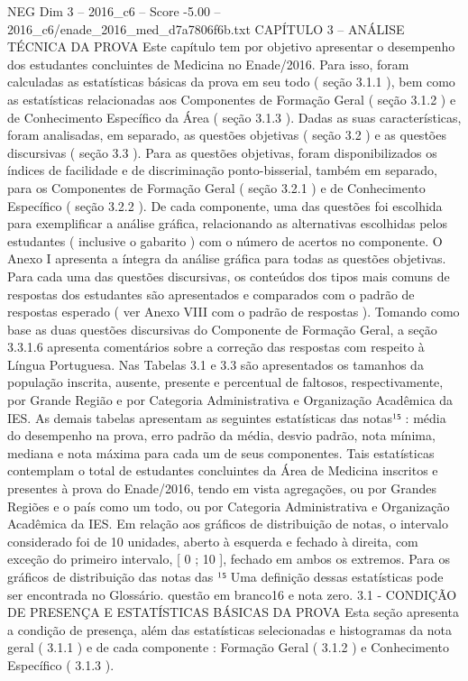 \begin{textsample}{NEG Dim 3 – 2016\_c6 – Score -5.00 – 2016\_c6/enade\_2016\_med\_d7a7806f6b.txt}  \label{ex:f3_neg_035}
CAPÍTULO 3 – ANÁLISE TÉCNICA DA PROVA Este capítulo tem por objetivo apresentar o desempenho dos estudantes concluintes de Medicina no Enade/2016.
Para isso, foram calculadas as estatísticas básicas da prova em seu todo ( seção 3.1.1 ), bem como as estatísticas relacionadas aos Componentes de Formação Geral ( seção 3.1.2 ) e de Conhecimento Específico da Área ( seção 3.1.3 ).
Dadas as suas características, foram analisadas, em separado, as questões objetivas ( seção 3.2 ) e as questões discursivas ( seção 3.3 ).
Para as questões objetivas, foram disponibilizados os índices de facilidade e de discriminação ponto-bisserial, também em separado, para os Componentes de Formação Geral ( seção 3.2.1 ) e de Conhecimento Específico ( seção 3.2.2 ).
De cada componente, uma das questões foi escolhida para exemplificar a análise gráfica, relacionando as alternativas escolhidas pelos estudantes ( inclusive o gabarito ) com o número de acertos no componente.
O Anexo I apresenta a íntegra da análise gráfica para todas as questões objetivas.
Para cada uma das questões discursivas, os conteúdos dos tipos mais comuns de respostas dos estudantes são apresentados e comparados com o padrão de respostas esperado ( ver Anexo VIII com o padrão de respostas ).
Tomando como base as duas questões discursivas do Componente de Formação Geral, a seção 3.3.1.6 apresenta comentários sobre a correção das respostas com respeito à Língua Portuguesa.
Nas Tabelas 3.1 e 3.3 são apresentados os tamanhos da população inscrita, ausente, presente e percentual de faltosos, respectivamente, por Grande Região e por Categoria Administrativa e Organização Acadêmica da IES.
As demais tabelas apresentam as seguintes estatísticas das notas¹⁵ : média do desempenho na prova, erro padrão da média, desvio padrão, nota mínima, mediana e nota máxima para cada um de seus componentes.
Tais estatísticas contemplam o total de estudantes concluintes da Área de Medicina inscritos e presentes à prova do Enade/2016, tendo em vista agregações, ou por Grandes Regiões e o país como um todo, ou por Categoria Administrativa e Organização Acadêmica da IES.
Em relação aos gráficos de distribuição de notas, o intervalo considerado foi de 10 unidades, aberto à esquerda e fechado à direita, com exceção do primeiro intervalo, [ 0 ; 10 ], fechado em ambos os extremos.
Para os gráficos de distribuição das notas das ¹⁵ Uma definição dessas estatísticas pode ser encontrada no Glossário. questão em branco16 e nota zero. 3.1 - CONDIÇÃO DE PRESENÇA E ESTATÍSTICAS BÁSICAS DA PROVA Esta seção apresenta a condição de presença, além das estatísticas selecionadas e histogramas da nota geral ( 3.1.1 ) e de cada componente : Formação Geral ( 3.1.2 ) e Conhecimento Específico ( 3.1.3 ).

\end{textsample}
